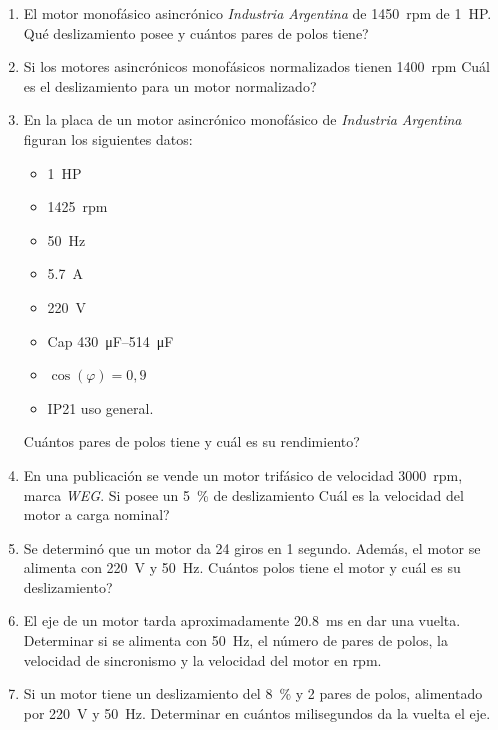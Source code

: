 \documentclass[../main]{subfiles}
\begin{document}
\begin{enumerate}
\item El motor monof\'asico{} asincr\'onico{} \emph{Industria Argentina} de \qty{1450}{rpm} de \qty{1}{HP}. \textquestiondown{}Qu\'e{} deslizamiento posee y cu\'antos{} pares de polos tiene?
\item Si los motores asincr\'onicos{} monof\'asicos{} normalizados tienen \qty{1400}{rpm} \textquestiondown{}Cu\'al{} es el deslizamiento para un motor normalizado?
\item En la placa de un motor asincr\'onico{} monof\'asico{} de \emph{Industria Argentina} figuran los siguientes datos:
\begin{itemize}
\item \qty{1}{HP}
\item \qty{1425}{rpm}
\item \qty{50}{Hz}
\item \qty{5.7}{A}
\item \qty{220}{V}
\item Cap \qtyrange{430}{514}{\micro F}
\item $\cos(\varphi) = 0,9$
\item IP21 uso general.
\end{itemize}
\textquestiondown{}Cu\'antos{} pares de polos tiene y cu\'al{} es su rendimiento?
\item En una publicaci\'on{} se vende un motor trif\'asico{} de velocidad \qty{3000}{rpm}, marca \emph{WEG}. Si posee un \qty{5}{\%} de deslizamiento \textquestiondown{}Cu\'al{} es la velocidad del motor a carga nominal?
\item Se determin\'o{} que un motor da 24 giros en 1 segundo. Adem\'as{}, el motor se alimenta con \qty{220}{V} y \qty{50}{Hz}. \textquestiondown{}Cu\'antos{} polos tiene el motor y cu\'al{} es su deslizamiento?
\item El eje de un motor tarda aproximadamente \qty{20,8}{ms} en dar una vuelta. Determinar si se alimenta con \qty{50}{Hz}, el n\'umero{} de pares de polos, la velocidad de sincronismo y la velocidad del motor en rpm.
\item Si un motor tiene un deslizamiento del \qty{8}{\%} y 2 pares de polos, alimentado por \qty{220}{V} y \qty{50}{Hz}. Determinar en cu\'antos{} milisegundos da la vuelta el eje.
\end{enumerate}
\end{document}
